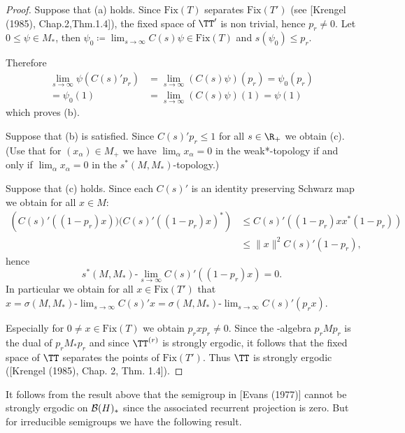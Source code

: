 \begin{proof}
Suppose that (a) holds.
Since $\text{Fix}(T)$ separates $\text{Fix}(T')$ (see [Krengel (1985), Chap.2,Thm.1.4]), the fixed space of $\TT'$ is non trivial, hence $p_{r} \neq 0$.
Let $0 \leq \psi \in M_{*}$, then $\psi_{0} \coloneqq \lim_{s \to \infty} C(s)\psi \in \text{Fix}(T)$ and $s(\psi_{0}) \leq p_{r}$.

\newpage

Therefore
\begin{align*}
\lim_{s \to \infty} \psi(C(s)'p_{r}) &= \lim_{s \to \infty} (C(s)\psi)(p_{r})  = \psi_{0}(p_{r})  \\
= \psi_{0}(1) &= \lim_{s \to \infty} (C(s)\psi)(1) = \psi(1)
\end{align*}
which proves (b).

Suppose that (b) is satisfied.
Since $C(s)'p_{r} \leq 1$ for all $s \in \R_{+}$ we obtain (c).
(Use that for $(x_{\alpha}) \in M_{+}$ we have $\lim_{\alpha}x_{\alpha} = 0$ in the weak*-topology if and only if $\lim_{\alpha}x_{\alpha} = 0$ in the $s^{*}(M,M_{*})$-topology.)

Suppose that (c) holds.
Since each $C(s)'$ is an identity preserving Schwarz map we obtain for all $x \in M$:
\begin{align*}
	\left( C(s)'((1-p_{r})x))(C(s)'((1-p_{r})x)^{*} \right) 
			&\leq C(s)'((1-p_{r})xx^{*}(1-p_{r}))  \\
 	&\leq \|x\|^2 C(s)'(1-p_{r}),
\end{align*}
hence
\[
s^{*}(M,M_{*})\text{-}\lim_{s \to \infty} C(s)'((1-p_{r})x) = 0.
\]
In particular we obtain for all $x \in \text{Fix}(T')$ that $x = \sigma(M,M_{*})\text{-}\lim_{s \to \infty} C(s)'x = \sigma(M,M_{*})\text{-}\lim_{s \to \infty} C(s)'(p_{r}x)$.

Especially for $0 \neq x \in \text{Fix}(T)$ we obtain $p_{r}xp_{r} \neq 0$.
Since the \WA-algebra $p_{r}Mp_{r}$ is the dual of $p_{r}M_{*}p_{r}$ and since $\TT^{(r)}$ is strongly ergodic, it follows that the fixed space of\/ $\TT$ separates the points of $\text{Fix}(T')$.
Thus $\TT$ is strongly ergodic ([Krengel (1985), Chap. 2, Thm. 1.4]).
\end{proof}

It follows from the result above that the semigroup in [Evans (1977)] cannot be strongly ergodic on $\mathcal{B}(H)_{*}$ since the associated recurrent projection is zero.
But for irreducible semigroups we have the following result.

\newpage

